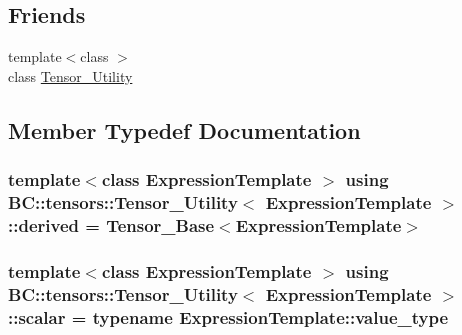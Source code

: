\subsection*{Friends}
\begin{DoxyCompactItemize}
\item 
{\footnotesize template$<$class $>$ }\\class \hyperlink{structBC_1_1tensors_1_1Tensor__Utility_a2c5e6098681f791432fcc61818c11375}{Tensor\+\_\+\+Utility}
\end{DoxyCompactItemize}


\subsection{Member Typedef Documentation}
\subsubsection[{\texorpdfstring{derived}{derived}}]{\setlength{\rightskip}{0pt plus 5cm}template$<$class Expression\+Template $>$ using {\bf B\+C\+::tensors\+::\+Tensor\+\_\+\+Utility}$<$ Expression\+Template $>$\+::{\bf derived} =  {\bf Tensor\+\_\+\+Base}$<$Expression\+Template$>$}\hypertarget{structBC_1_1tensors_1_1Tensor__Utility_a239565220d275ad807c9969dde8c775b}{}\label{structBC_1_1tensors_1_1Tensor__Utility_a239565220d275ad807c9969dde8c775b}
\subsubsection[{\texorpdfstring{scalar}{scalar}}]{\setlength{\rightskip}{0pt plus 5cm}template$<$class Expression\+Template $>$ using {\bf B\+C\+::tensors\+::\+Tensor\+\_\+\+Utility}$<$ Expression\+Template $>$\+::{\bf scalar} =  typename Expression\+Template\+::value\+\_\+type}\hypertarget{structBC_1_1tensors_1_1Tensor__Utility_a77d35af590f103f5d512ade9bf2be6c9}{}\label{structBC_1_1tensors_1_1Tensor__Utility_a77d35af590f103f5d512ade9bf2be6c9}
